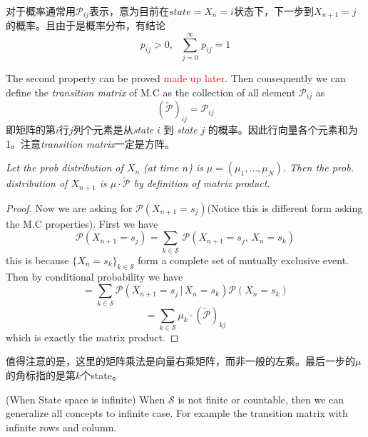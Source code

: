 \documentclass[10.5pt]{article}
\newenvironment{changemargin}[2]{%
  \begin{list}{}{%
    \setlength{\topsep}{0pt}%
    \setlength{\leftmargin}{#1}%
    \setlength{\rightmargin}{#2}%
    \setlength{\listparindent}{\parindent}%
    \setlength{\itemindent}{\parindent}%
    \setlength{\parsep}{\parskip}%
  }%
  \item[]}{\end{list}}
\begin{document}
\begin{changemargin}{-0.125in}{0in}
\begin{enumerate}
\begin{enumerate}
	 \smallskip
	 
	 
	 对于概率通常用$\mathcal{P}_{ij}$表示，意为目前在$\textit{state} = X_n = i$状态下，下一步到$X_{n+1} = j$的概率。且由于是概率分布，有结论
	 \[
	 p_{ij} > 0,\,\,\,\,\sum^\infty_{j=0}\, p_{ij} = 1 
	 \]
	
     The second property can be proved \textcolor{red}{made up later}. Then consequently we can define the \textit{transition matrix} of M.C as the collection of all element $\mathcal{P}_{ij}$ as 
     \[
     (\utilde{\mathcal{P}})_{ij} = \mathcal{P}_{ij}  
     \]
     即矩阵的第$i$行$j$列个元素是从\textit{state} $i$ 到 \textit{state} $j$ 的概率。因此行向量各个元素和为1。注意\textit{transition matrix}一定是方阵。
     
     \medskip
     
     \begin{remark} \textit{Let the prob distribution of $X_n$ (at time $n$) is $\mu = (\mu_1, ..., \mu_N)$. Then the prob. distribution of $X_{n+1}$ is $\mu \cdot \utilde{\mathcal{P}}$ by definition of matrix product.}
     \end{remark}
     
     \medskip
     
     \begin{proof}
     	Now we are asking for $\mathcal{P}(X_{n+1} = s_j)$(Notice this is different form asking the M.C properties). First we have 
     	\[
     	\mathcal{P}(X_{n+1} = s_j) = \sum_{k \in \mathcal{S}}\, \mathcal{P}(X_{n+1} = s_j, \,X_n = s_k)
     	\]
     	this is because $\{X_n = s_k\}_{k \in \mathcal{S}}$ form a complete set of mutually exclusive event. Then by conditional probability we have 
     	\[
     	 = \sum_{k \in \mathcal{S}} \mathcal{P}(X_{n+1} = s_j\,| \,X_n = s_k) \mathcal{P}(X_n = s_k)
     	\] 
     	\[
     	 = \sum_{k \in \mathcal{S}} \mu_k \cdot (\utilde{\mathcal{P}})_{kj}
     	\]
     	which is exactly the matrix product.
     \end{proof}
     
     
     \medskip
     
     值得注意的是，这里的矩阵乘法是向量右乘矩阵，而非一般的左乘。最后一步的$\mu$的角标指的是第$k$个state。
     \medskip
     
     \begin{remark}(When State space is infinite) When $\mathcal{S}$ is not finite or countable, then we can generalize all concepts to infinite case. For example the transition matrix with infinite rows and column. 
     \end{remark}
     

\end{enumerate}
\end{enumerate}
\end{changemargin}
\end{document}
